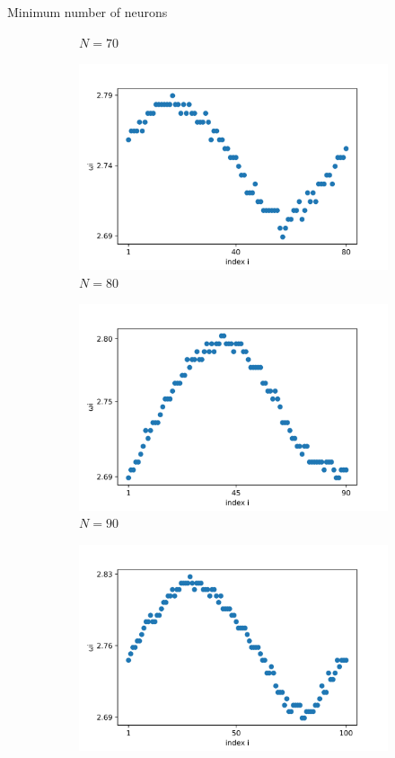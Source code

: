 \documentclass{beamer}
\begin{document}
\begin{frame}{Minimum number of neurons}
\begin{figure}[H]
\begin{subfigure}{.32\textwidth}
  \caption{$N=70$}
\end{subfigure}
\begin{subfigure}{.32\textwidth}
  \centering
  \includegraphics[width=1\linewidth]{w_N=80.png}  
  \caption{$N=80$}
\end{subfigure}
\hfill
\begin{subfigure}{.32\textwidth}
  \centering
  \includegraphics[width=1\linewidth]{w_N=90.png}  
  \caption{$N=90$}
\end{subfigure}
\hfill
\begin{subfigure}{.32\textwidth}
  \centering
  \includegraphics[width=1\linewidth]{w_N=100.png}  

\end{subfigure}
\end{figure}
\end{frame}
\end{document}
